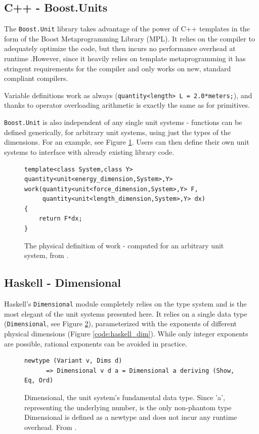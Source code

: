 \documentclass[12pt,oneside,a4paper]{scrbook}
\theoremstyle{definition}
\begin{document}
\subsection{C++ - Boost.Units}

The \verb/Boost.Unit/ library takes advantage of the power of C++ templates in the form of the Boost Metaprogramming Library (MPL).  It relies on the compiler to adequately optimize the code, but then incurs no performance overhead at runtime \citep{Schabel10}.However, since it heavily relies on template metaprogramming it has stringent requirements for the compiler and only works on new, standard compliant compilers.

Variable definitions work as always (\verb/quantity<length> L = 2.0*meters;/), and thanks to operator overloading arithmetic is exactly the same as for primitives.

\verb/Boost.Unit/ is also independent of any single unit systems - functions can be defined generically, for arbitrary unit systems, using just the types of the dimensions. For an example, see Figure \ref{code:boost_units_generic}. Users can then define their own unit systems to interface with already existing library code.

\begin{figure}
\begin{verbatim}
template<class System,class Y>
quantity<unit<energy_dimension,System>,Y>
work(quantity<unit<force_dimension,System>,Y> F,
     quantity<unit<length_dimension,System>,Y> dx)
{
    return F*dx;
}
\end{verbatim}
\caption{The physical definition of work - computed for an arbitrary unit system, from \citep{Schabel10}.}
\label{code:boost_units_generic}
\end{figure}


\subsection{Haskell - Dimensional}
Haskell's \verb/Dimensional/ module \citep{Buckwalter06} completely relies on the type system and is the most elegant of the unit systems presented here. It relies on a single data type (\verb/Dimensional/, see Figure \ref{code:haskell_dimensional}), parameterized with the exponents of different physical dimensions (Figure \ref{code:haskell_dim}). While only integer exponents are possible, rational exponents can be avoided in practice.

\begin{figure}
\begin{verbatim}
newtype (Variant v, Dims d)
      => Dimensional v d a = Dimensional a deriving (Show, Eq, Ord)
\end{verbatim}
\caption{Dimensional, the unit system's fundamental data type. Since 'a', representing the underlying number, is the only non-phantom type Dimensional is defined as a newtype and does not incur any runtime overhead. From \citep{Buckwalter06}.}
\label{code:haskell_dimensional}
\end{figure}
\end{document}
